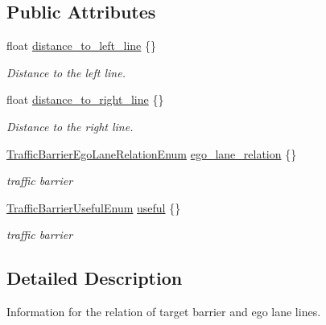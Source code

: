\subsection*{Public Attributes}
\begin{DoxyCompactItemize}
\item 
float \hyperlink{structmaf__perception__interface_1_1TrafficBarrierEgoLaneRelationInfo_a4edf775efd0b98fc4c5017f57c5c8db5}{distance\+\_\+to\+\_\+left\+\_\+line} \{\}
\begin{DoxyCompactList}\small\item\em Distance to the left line. \end{DoxyCompactList}\item 
float \hyperlink{structmaf__perception__interface_1_1TrafficBarrierEgoLaneRelationInfo_a9c3a799ea16f2e92d2a51e228c5d06b2}{distance\+\_\+to\+\_\+right\+\_\+line} \{\}
\begin{DoxyCompactList}\small\item\em Distance to the right line. \end{DoxyCompactList}\item 
\hyperlink{structmaf__perception__interface_1_1TrafficBarrierEgoLaneRelationEnum}{Traffic\+Barrier\+Ego\+Lane\+Relation\+Enum} \hyperlink{structmaf__perception__interface_1_1TrafficBarrierEgoLaneRelationInfo_a022780aeda3e68fe5c732d012077f8a3}{ego\+\_\+lane\+\_\+relation} \{\}
\begin{DoxyCompactList}\small\item\em traffic barrier \end{DoxyCompactList}\item 
\hyperlink{structmaf__perception__interface_1_1TrafficBarrierUsefulEnum}{Traffic\+Barrier\+Useful\+Enum} \hyperlink{structmaf__perception__interface_1_1TrafficBarrierEgoLaneRelationInfo_a986635d2fe7266f21f4a531f2eb4f4b0}{useful} \{\}
\begin{DoxyCompactList}\small\item\em traffic barrier \end{DoxyCompactList}\end{DoxyCompactItemize}


\subsection{Detailed Description}
Information for the relation of target barrier and ego lane lines. 

